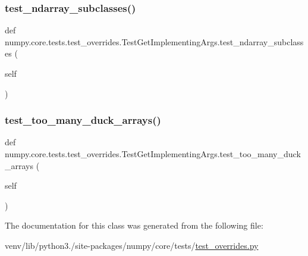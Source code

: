 \subsubsection{\texorpdfstring{test\+\_\+ndarray\+\_\+subclasses()}{test\_ndarray\_subclasses()}}
{\footnotesize\ttfamily def numpy.\+core.\+tests.\+test\+\_\+overrides.\+Test\+Get\+Implementing\+Args.\+test\+\_\+ndarray\+\_\+subclasses (\begin{DoxyParamCaption}\item[{}]{self }\end{DoxyParamCaption})}

\mbox{\label{classnumpy_1_1core_1_1tests_1_1test__overrides_1_1TestGetImplementingArgs_a4e6a72e27486b18948245f7a5645f557}} 
\subsubsection{\texorpdfstring{test\+\_\+too\+\_\+many\+\_\+duck\+\_\+arrays()}{test\_too\_many\_duck\_arrays()}}
{\footnotesize\ttfamily def numpy.\+core.\+tests.\+test\+\_\+overrides.\+Test\+Get\+Implementing\+Args.\+test\+\_\+too\+\_\+many\+\_\+duck\+\_\+arrays (\begin{DoxyParamCaption}\item[{}]{self }\end{DoxyParamCaption})}



The documentation for this class was generated from the following file\+:\begin{DoxyCompactItemize}
\item 
venv/lib/python3./site-\/packages/numpy/core/tests/\hyperlink{test__overrides_8py}{test\+\_\+overrides.\+py}\end{DoxyCompactItemize}
